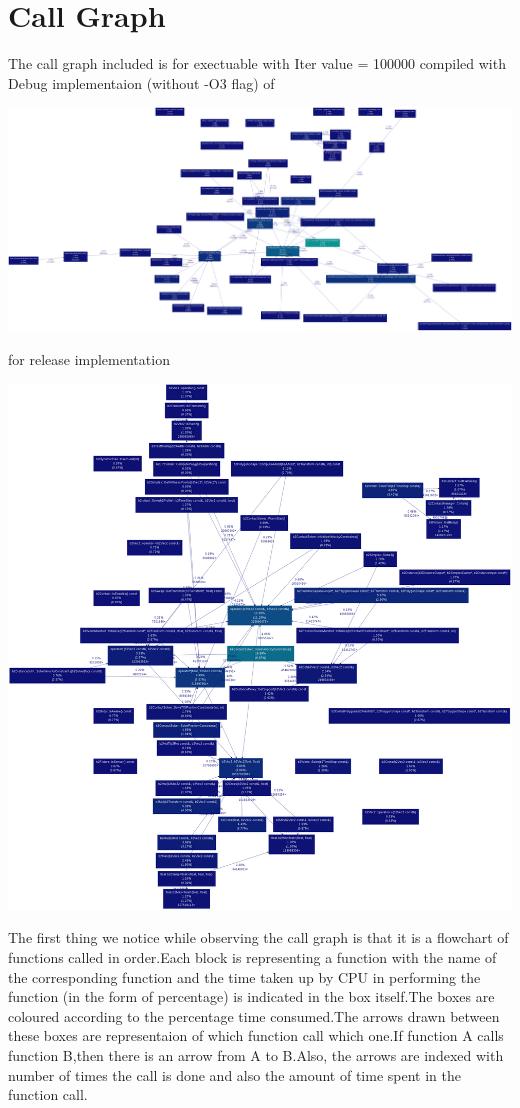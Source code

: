 \documentclass[11pt]{article}
\begin{document}
\section{Call Graph}
The call graph included is for exectuable with Iter value = 100000 compiled with Debug implementaion (without -O3 flag) of 
\begin{center}
\includegraphics[scale=0.1]{../details/images/debug.png}
\end{center}
for release implementation\\
\begin{center}
\includegraphics[scale=0.1]{../details/images/release.png}
\end{center}
The first thing we notice while observing the call graph is that it is a flowchart of functions called in order.Each block is representing a function with the name of the corresponding function and the time taken up by CPU in performing the function (in the form of percentage) is indicated in the box itself.The boxes are coloured according to the percentage time consumed.The arrows drawn between these boxes are representaion of which function call which one.If function A calls function B,then there is an arrow from A to B.Also, the arrows are indexed with number of times the call is done and also the amount of time spent in the function call.
\end{document}
